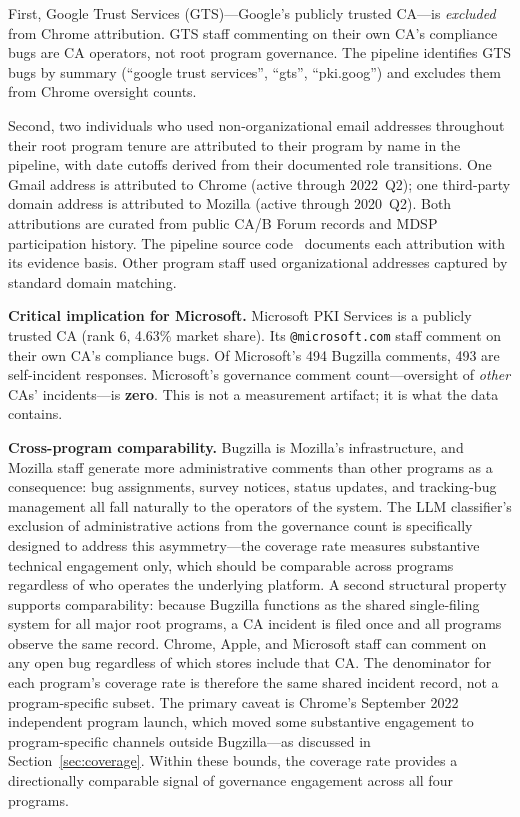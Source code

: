 \documentclass[10pt,twocolumn,letterpaper]{article}
\begin{document}
First, Google Trust Services (GTS)---Google's publicly trusted CA---is
\textit{excluded} from Chrome attribution. GTS staff commenting on their
own CA's compliance bugs are CA operators, not root program governance.
The pipeline identifies GTS bugs by summary (``google trust services'',
``gts'', ``pki.goog'') and excludes them from Chrome oversight counts.

Second, two individuals who used non-organizational email addresses
throughout their root program tenure are attributed to their program
by name in the pipeline, with date cutoffs derived from their documented
role transitions. One Gmail address is attributed to Chrome (active through
2022~Q2); one third-party domain address is attributed to Mozilla (active
through 2020~Q2). Both attributions are curated from public CA/B Forum
records and MDSP participation history. The pipeline source code~\cite{github-code}
documents each attribution with its evidence basis. Other program staff
used organizational addresses captured by standard domain matching.

\textbf{Critical implication for Microsoft.} Microsoft PKI Services is a
publicly trusted CA (rank 6, 4.63\% market share). Its \texttt{@microsoft.com}
staff comment on their own CA's compliance bugs. Of Microsoft's 494 Bugzilla
comments, 493 are self-incident responses. Microsoft's governance comment
count---oversight of \textit{other} CAs' incidents---is \textbf{zero}.
This is not a measurement artifact; it is what the data contains.

\textbf{Cross-program comparability.} Bugzilla is Mozilla's infrastructure,
and Mozilla staff generate more administrative comments than other programs
as a consequence: bug assignments, survey notices, status updates, and
tracking-bug management all fall naturally to the operators of the system.
The LLM classifier's exclusion of administrative actions from the governance
count is specifically designed to address this asymmetry---the coverage
rate measures substantive technical engagement only, which should be
comparable across programs regardless of who operates the underlying
platform. A second structural property supports comparability: because
Bugzilla functions as the shared single-filing system for all major
root programs, a CA incident is filed once and all programs observe the
same record. Chrome, Apple, and Microsoft staff can comment on any open
bug regardless of which stores include that CA. The denominator for each
program's coverage rate is therefore the same shared incident record,
not a program-specific subset. The primary caveat is Chrome's September
2022 independent program launch, which moved some substantive engagement
to program-specific channels outside Bugzilla---as discussed in
Section~\ref{sec:coverage}. Within these bounds, the coverage rate
provides a directionally comparable signal of governance engagement
across all four programs.
\end{document}
